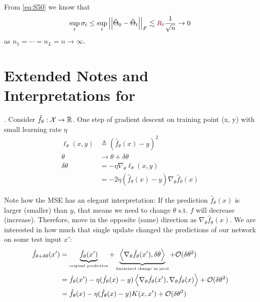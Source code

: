 \documentclass{article}
\begin{document}
\begin{appendices}
\begin{compactenum}
	\item From \ref{eq:S50} we know that 
	\begin{align}
		\sup_t \sigma_t \leq \sup_t \norm[F]{\hat\Theta_0 - \hat\Theta_t} \lesssim \r \inv{\sqrt n} \to 0
	\end{align}
	as $n_1 = \cdots = n_L = n \to \infty$. 
\end{compactenum}


\clearpage 
\section{Extended Notes and Interpretations for \cite{simon2021}}\label{sec:simon}

. Consider $\hat f_{\theta}: \mathcal X \to \mathbb{R}$. One step of gradient descent on training point (x, y) with small learning rate $\eta$
\begin{align}
	\ell_{\theta}(x, y)
	&\triangleq (\hat f_{\theta}(x) - y)^2 \\
	\theta
	&\rightarrow \theta + \delta \theta \\
	\delta \theta 
	&= - \eta \nabla_{\theta} \ell_{\theta}(x, y) \\
	&= -2 \eta (\hat f_{\theta}(x) - y) \nabla_{\theta} \hat f_{\theta}(x)
\end{align}

Note how the MSE has an elegant interpretation: If the prediction $\hat f_{\theta}(x)$ is larger (smaller) than $y$, that means we need to change $\theta$ s.t. $\hat f$ will decrease (increase). Therefore, move in the opposite (same) direction as $\nabla_{\theta} \hat f_{\theta}(x)$. We are interested in how much that single update changed the predictions of our network on some test input $x'$:
\begin{align}
	\hat f_{\theta + \delta \theta}(x')
	&= \underbrace{\hat f_{\theta}(x')}_{\text{\tiny original prediction}} 
	+ \underbrace{ \left\langle \nabla_{\theta} \hat f_{\theta}(x'), \delta \theta \right\rangle}_{\text{\tiny linearized change in pred}} + \mathcal O(\delta \theta^2) \\
	&= \hat f_{\theta}(x') 
	- \eta (\hat f_{\theta}(x) - y) \left\langle \nabla_{\theta} \hat f_{\theta}(x')  ,  \nabla_{\theta} \hat f_{\theta}(x)  \right\rangle + \mathcal O(\delta \theta^2) \\
	&= \hat f_{\theta}(x) - \eta  (\hat f_{\theta}(x) - y) K(x, x') + \mathcal O(\delta \theta^2) 
\end{align}


\end{appendices}
\end{document}

